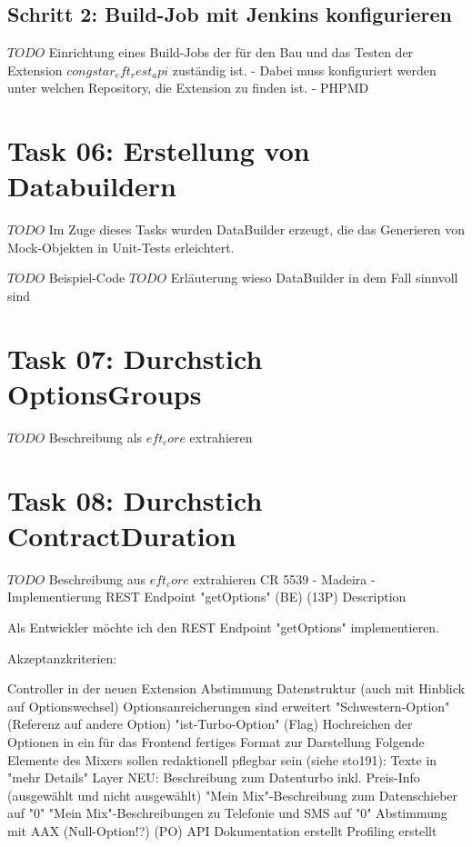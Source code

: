 \documentclass[11pt,a4paper]{article} %
\begin{document}
\subsection{Schritt 2: Build-Job mit Jenkins konfigurieren}

$TODO$ Einrichtung eines Build-Jobs der für den Bau und das Testen
der Extension $congstar_eft_rest_api$ zuständig ist.
- Dabei muss konfiguriert werden unter welchen Repository, die Extension zu finden ist.
- PHPMD

\section{Task 06: Erstellung von Databuildern}

$TODO$ Im Zuge dieses Tasks wurden DataBuilder erzeugt, die das Generieren von Mock-Objekten in Unit-Tests erleichtert.

$TODO$ Beispiel-Code 
$TODO$ Erläuterung wieso DataBuilder in dem Fall sinnvoll sind

\section{Task 07: Durchstich OptionsGroups}

$TODO$ Beschreibung als $eft_core$ extrahieren

\section{Task 08: Durchstich ContractDuration}

$TODO$ Beschreibung aus $eft_core$ extrahieren
CR 5539 - Madeira - Implementierung REST Endpoint "getOptions" (BE) (13P)
Description


Als Entwickler möchte ich den REST Endpoint "getOptions" implementieren.

Akzeptanzkriterien:

Controller in der neuen Extension
Abstimmung Datenstruktur (auch mit Hinblick auf Optionswechsel)
Optionsanreicherungen sind erweitert
"Schwestern-Option" (Referenz auf andere Option)
"ist-Turbo-Option" (Flag)
Hochreichen der Optionen in ein für das Frontend fertiges Format zur Darstellung
Folgende Elemente des Mixers sollen redaktionell pflegbar sein (siehe sto191):
Texte in "mehr Details" Layer
NEU: Beschreibung zum Datenturbo inkl. Preis-Info (ausgewählt und nicht ausgewählt)
"Mein Mix"-Beschreibung zum Datenschieber auf "0"
"Mein Mix"-Beschreibungen zu Telefonie und SMS auf "0"
Abstimmung mit AAX (Null-Option!?) (PO)
API Dokumentation erstellt
Profiling erstellt
\end{document}
